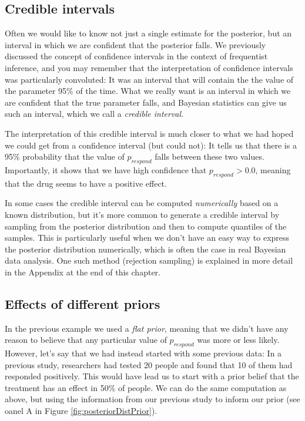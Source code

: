 \documentclass[12pt,]{book}
\theoremstyle{definition}
\theoremstyle{definition}
\theoremstyle{definition}
\theoremstyle{remark}
\begin{document}
\hypertarget{credible-intervals}{%
\subsection{Credible intervals}\label{credible-intervals}}

Often we would like to know not just a single estimate for the posterior, but an interval in which we are confident that the posterior falls. We previously discussed the concept of confidence intervals in the context of frequentist inference, and you may remember that the interpretation of confidence intervals was particularly convoluted: It was an interval that will contain the the value of the parameter 95\% of the time. What we really want is an interval in which we are confident that the true parameter falls, and Bayesian statistics can give us such an interval, which we call a \emph{credible interval}.

The interpretation of this credible interval is much closer to what we had hoped we could get from a confidence interval (but could not): It tells us that there is a 95\% probability that the value of \(p_{respond}\) falls between these two values. Importantly, it shows that we have high confidence that \(p_{respond} > 0.0\), meaning that the drug seems to have a positive effect.

In some cases the credible interval can be computed \emph{numerically} based on a known distribution, but it's more common to generate a credible interval by sampling from the posterior distribution and then to compute quantiles of the samples. This is particularly useful when we don't have an easy way to express the posterior distribution numerically, which is often the case in real Bayesian data analysis. One such method (rejection sampling) is explained in more detail in the Appendix at the end of this chapter.

\hypertarget{effects-of-different-priors}{%
\subsection{Effects of different priors}\label{effects-of-different-priors}}

In the previous example we used a \emph{flat prior}, meaning that we didn't have any reason to believe that any particular value of \(p_{respond}\) was more or less likely. However, let's say that we had instead started with some previous data: In a previous study, researchers had tested 20 people and found that 10 of them had responded positively. This would have lead us to start with a prior belief that the treatment has an effect in 50\% of people. We can do the same computation as above, but using the information from our previous study to inform our prior (see oanel A in Figure \ref{fig:posteriorDistPrior}).
\end{document}
